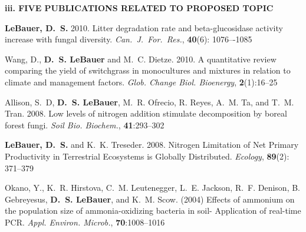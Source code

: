 \documentclass[12pt]{article}
\begin{document}

\textbf{iii. FIVE PUBLICATIONS RELATED TO PROPOSED TOPIC}
\setlength{\parindent}{-0.3em}
\par\bigskip
\textbf{LeBauer, D.~S.} 2010. Litter degradation rate and beta-glucosidase activity increase with fungal diversity. \textit{Can.\ J.\ For.\ Res.}, \textbf{40}(6): 1076–-1085
\par
Wang, D., \textbf{D.~S. LeBauer} and M.~C. Dietze. 2010. A quantitative review comparing the yield of
switchgrass in monocultures and mixtures in relation to climate and management factors. \textit{Glob.
Change Biol. Bioenergy}, \textbf{2}(1):16--25
\par
Allison, S.~D, \textbf{D.~S. LeBauer}, M.~R. Ofrecio, R. Reyes, A.~M. Ta, and T.~M. Tran. 2008. Low levels of
nitrogen addition stimulate decomposition by boreal forest fungi. \textit{Soil Bio. Biochem.}, \textbf{41}:293--302
\par
\textbf{LeBauer, D.~S.} and K.~K. Treseder. 2008. Nitrogen Limitation of Net Primary Productivity in
Terrestrial Ecosystems is Globally Distributed. \textit{Ecology}, \textbf{89}(2): 371--379
\par
Okano, Y., K.~R. Hirstova, C.~M. Leutenegger, L.~E. Jackson, R.~F. Denison, B. Gebreyesus, \textbf{D.~S.
LeBauer}, and K.~M. Scow. (2004) Effects of ammonium on the population size of ammonia-oxidizing
bacteria in soil- Application of real-time PCR. \textit{Appl. Environ. Microb.}, \textbf{70}:1008--1016
\par
\setlength{\parindent}{0em}
\par\bigskip
\clearpage
\end{document}
